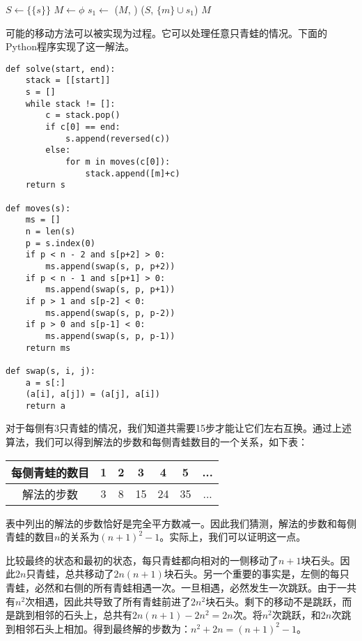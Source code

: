 \documentclass[UTF8]{article}
\begin{document}
\begin{algorithmic}[1]
  \State $S \gets \{\{s\}\}$
  \State $M \gets \phi$
    \State $s_1 \gets$ 
      \State {}($M$, )
    \Else
        \State {}($S$, $\{m\} \cup s_1$)
      \EndFor
    \EndIf
  \EndWhile
  \State \Return $M$
\EndFunction
\end{algorithmic}

可能的移动方法可以被实现为过程。它可以处理任意只青蛙的情况。下面的Python程序实现了这一解法。

\lstset{language=Python}
\begin{lstlisting}
def solve(start, end):
    stack = [[start]]
    s = []
    while stack != []:
        c = stack.pop()
        if c[0] == end:
            s.append(reversed(c))
        else:
            for m in moves(c[0]):
                stack.append([m]+c)
    return s

def moves(s):
    ms = []
    n = len(s)
    p = s.index(0)
    if p < n - 2 and s[p+2] > 0:
        ms.append(swap(s, p, p+2))
    if p < n - 1 and s[p+1] > 0:
        ms.append(swap(s, p, p+1))
    if p > 1 and s[p-2] < 0:
        ms.append(swap(s, p, p-2))
    if p > 0 and s[p-1] < 0:
        ms.append(swap(s, p, p-1))
    return ms

def swap(s, i, j):
    a = s[:]
    (a[i], a[j]) = (a[j], a[i])
    return a
\end{lstlisting}

对于每侧有3只青蛙的情况，我们知道共需要15步才能让它们左右互换。通过上述算法，我们可以得到解法的步数和每侧青蛙数目的一个关系，如下表：

\begin{tabular}{c|c|c|c|c|c|c}
每侧青蛙的数目 & 1 & 2 & 3  & 4  & 5 & ... \\
\hline
解法的步数 & 3 & 8 & 15 & 24 & 35 & ...
\end{tabular}

表中列出的解法的步数恰好是完全平方数减一。因此我们猜测，解法的步数和每侧青蛙的数目$n$的关系为$(n+1)^2 - 1$。实际上，我们可以证明这一点。

比较最终的状态和最初的状态，每只青蛙都向相对的一侧移动了$n+1$块石头。因此$2n$只青蛙，总共移动了$2n(n+1)$块石头。另一个重要的事实是，左侧的每只青蛙，必然和右侧的所有青蛙相遇一次。一旦相遇，必然发生一次跳跃。由于一共有$n^2$次相遇，因此共导致了所有青蛙前进了$2n^2$块石头。剩下的移动不是跳跃，而是跳到相邻的石头上，总共有$2n(n+1) - 2n^2 = 2n$次。将$n^2$次跳跃，和$2n$次跳到相邻石头上相加。得到最终解的步数为：$n^2 + 2n = (n+1)^2 -1$。
\end{document}
